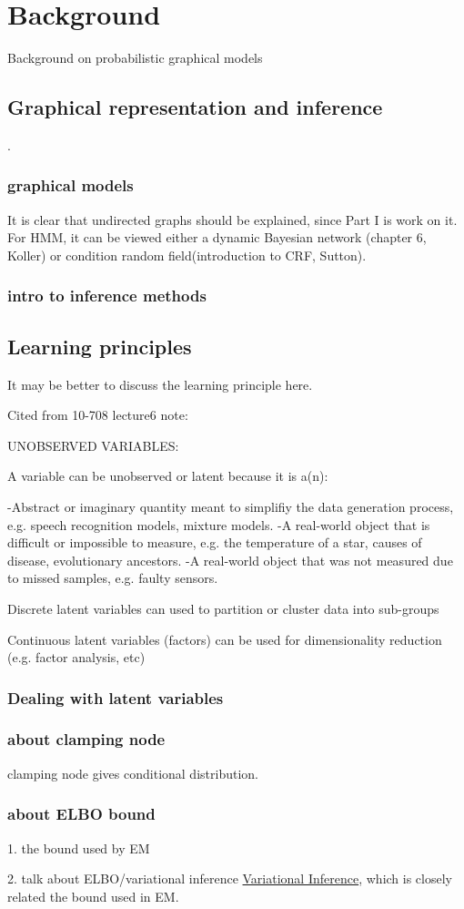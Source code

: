\chapter{Background}
\label{chapter2}
Background on probabilistic graphical models

\section{Graphical representation and inference}.
\subsection{graphical models}
It is clear that undirected graphs should be explained, since Part I is work on it. For HMM, it can be viewed either a dynamic Bayesian network (chapter 6, Koller) or condition random field(introduction to CRF, Sutton).


\subsection{intro to inference methods}
\section{Learning principles}
It may be better to discuss the learning principle here.

Cited from 10-708 lecture6 note:

UNOBSERVED VARIABLES:

A variable can be unobserved or latent because it is a(n):

-Abstract or imaginary quantity meant to simplifiy the data generation process, e.g. speech recognition models, mixture models.
-A real-world object that is difficult or impossible to measure, e.g. the temperature of a star, causes of disease, evolutionary ancestors.
-A real-world object that was not measured due to missed samples, e.g. faulty sensors.

Discrete latent variables can used to partition or cluster data into sub-groups

Continuous latent variables (factors) can be used for dimensionality reduction (e.g. factor analysis, etc)
\subsection{Dealing with latent variables}
\subsection{about clamping node}
clamping node gives conditional distribution.

\subsection{about ELBO bound}
1. the bound used by EM

2. talk about ELBO/variational inference \href{https://media.nips.cc/Conferences/2016/Slides/6199-Slides.pdf}{Variational Inference}, which is closely related the bound used in EM.

